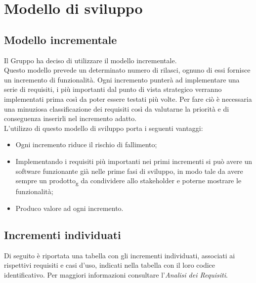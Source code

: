 \section{Modello di sviluppo}
\subsection{Modello incrementale}
Il Gruppo ha deciso di utilizzare il modello incrementale. \\
 Questo modello prevede un determinato numero di rilasci, ognuno di essi fornisce un incremento di funzionalità.
Ogni incremento punterà ad implementare una serie di requisiti,  i più importanti dal punto di vista strategico verranno implementati prima così da poter essere testati più volte.  Per fare ciò è necessaria una minuziosa classificazione dei requisiti così da valutarne la priorità e di conseguenza inserirli nel incremento adatto.\\
L'utilizzo di questo modello di sviluppo porta i seguenti vantaggi:
\begin{itemize}
\item Ogni incremento riduce il rischio di fallimento;
\item Implementando i requisiti più importanti nei primi incrementi si può avere un software funzionante già nelle prime fasi di sviluppo, in modo tale da avere sempre un prodotto\textsubscript{g} da condividere allo stakeholder e poterne mostrare le funzionalità;
\item  Produco valore ad ogni incremento.
\end{itemize}

\subsection{Incrementi individuati}
Di seguito è riportata una tabella con gli incrementi individuati, associati ai rispettivi requisiti 
e casi d'uso, indicati nella tabella con il loro codice identificativo. Per maggiori informazioni consultare
l'\textit{Analisi dei Requisiti}.

